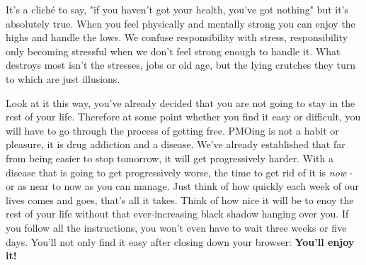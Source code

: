 It's a cliché to say, "if you haven't got your health, you've got nothing" but it's absolutely true. When you feel physically and mentally strong you can enjoy the highs and handle the lows. We confuse responsibility with stress, responsibility only becoming stressful when we don't feel strong enough to handle it. What destroys most isn't the stresses, jobs or old age, but the lying crutches they turn to which are just illusions.

Look at it this way, you've already decided that you are not going to stay in the rest of your life. Therefore at some point whether you find it easy or difficult, you will have to go through the process of getting free. PMOing is not a habit or pleasure, it is drug addiction and a disease. We've already established that far from being easier to stop tomorrow, it will get progressively harder. With a disease that is going to get progressively worse, the time to get rid of it is \textit{now} - or as near to now as you can manage. Just think of how quickly each week of our lives comes and goes, that's all it takes. Think of how nice it will be to enoy the rest of your life without that ever-increasing black shadow hanging over you. If you follow all the instructions, you won't even have to wait three weeks or five days. You'll not only find it easy after closing down your browser: \textbf{You'll enjoy it!}
